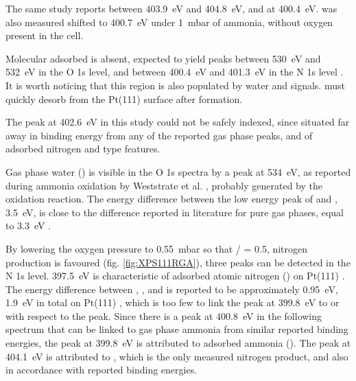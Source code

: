 The same study reports  between \qty{403.9}{\eV} and \qty{404.8}{\eV}, and  at \qty{400.4}{\eV}.
 was also measured shifted to \qty{400.7}{\eV} under \qty{1}{\milli\bar} of ammonia, without oxygen present in the cell.

Molecular adsorbed  is absent, expected to yield peaks between \qty{530}{\eV} and \qty{532}{\eV} in the O 1s level, and between \qty{400.4}{\eV} and \qty{401.3}{\eV} in the N 1s level \parencite{Kiskinova1984, Zhu2003, Gunther2008}.
It is worth noticing that this region is also populated by water and  signals.
 must quickly desorb from the Pt(111) surface after formation.

The peak at \qty{402.6}{\eV} in this study could not be safely indexed, since situated far away in binding energy from any of the reported gas phase peaks, and of adsorbed nitrogen and  type features.

Gas phase water () is visible in the O 1s spectra by a peak at \qty{534}{\eV}, as reported during ammonia oxidation by Weststrate et al. \parencite*{Weststrate2006}, probably generated by the oxidation reaction.
The energy difference between the low energy peak of  and , \qty{3.5}{\eV}, is close to the difference reported in literature for pure gas phases, equal to \qty{3.3}{\eV} \parencite{Linford2019, Avval2022}.

By lowering the oxygen pressure to \qty{0.55}{\milli\bar} so that / = 0.5, nitrogen production is favoured (fig. \ref{fig:XPS111RGA}), three peaks can be detected in the N 1s level.
\qty{397.5}{\eV} is characteristic of adsorbed atomic nitrogen () on Pt(111) \parencite{vandenBroek1999, Zhu2003}.
The energy difference between , , and  is reported to be approximately \qty{0.95}{\eV}, \qty{1.9}{\eV} in total on Pt(111) \parencite{Ivashenko2021}, which is too few to link the peak at \qty{399.8}{\eV} to  or  with respect to the  peak.
Since there is a peak at \qty{400.8}{\eV} in the following spectrum that can be linked to gas phase ammonia from similar reported binding energies, the peak at \qty{399.8}{\eV} is attributed to adsorbed ammonia ().
The peak at \qty{404.1}{\eV} is attributed to , which is the only measured nitrogen product, and also in accordance with reported binding energies.

